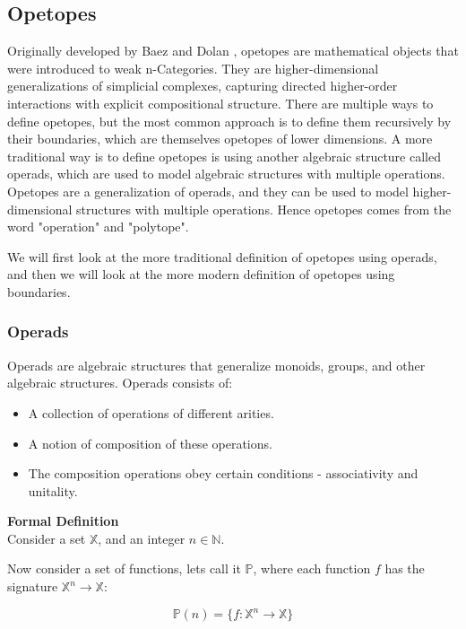 
\subsection{Opetopes}
Originally developed by Baez and Dolan \citep{baez1997higher}, opetopes are mathematical objects that were introduced to weak n-Categories. They are higher-dimensional generalizations of simplicial complexes, capturing directed higher-order interactions with explicit compositional structure. There are multiple ways to define opetopes, but the most common approach is to define them recursively by their boundaries, which are themselves opetopes of lower dimensions. A more traditional way is to define opetopes is using another algebraic structure called operads, which are used to model algebraic structures with multiple operations. Opetopes are a generalization of operads, and they can be used to model higher-dimensional structures with multiple operations. Hence opetopes comes from the word "operation" and "polytope".

We will first look at the more traditional definition of opetopes using operads, and then we will look at the more modern definition of opetopes using boundaries.

\subsubsection{Operads}

Operads are algebraic structures that generalize monoids, groups, and other algebraic structures. Operads consists of:

\begin{itemize}
  \item A collection of operations of different arities.
  \item A notion of composition of these operations.
  \item The composition operations obey certain conditions - associativity and unitality.
\end{itemize}

\textbf{Formal Definition}
\\

Consider a set $\mathbb{X}$, and an integer $n \in \mathbb{N}$.

Now consider a set of functions, lets call it $\mathbb{P}$, where each function $f$ has the signature $\mathbb{X}^n \to \mathbb{X}$:

\begin{equation}
  \mathbb{P}(n) = \{f: \mathbb{X}^n \to \mathbb{X}\}
\end{equation}

